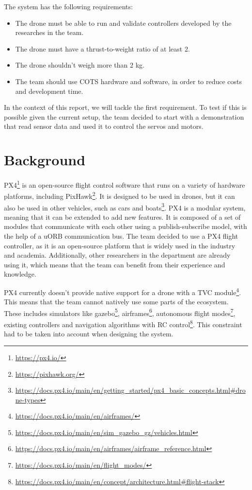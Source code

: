 \documentclass[a4paper]{article}
\begin{document}
The system has the following requirements: 
\begin{itemize}
    \item The drone must be able to run and validate controllers developed by the researches in the team. 
    \item The drone must have a thrust-to-weight ratio of at least 2. 
    \item The drone shouldn't weigh more than 2 kg. 
    \item The team should use COTS hardware and software, in order to reduce costs and development time. 
\end{itemize}

In the context of this report, we will tackle the first requirement. 
To test if this is possible given the current setup, the team decided to start with a demonstration that read sensor data and used it to control the servos and motors. 

\clearpage
\label{sec::background}
\section{Background}

PX4\footnote{\url{https://px4.io/}} is an open-source flight control software that runs on a variety of hardware platforms, including PixHawk\footnote{\url{https://pixhawk.org/}}.
It is designed to be used in drones, but it can also be used in other vehicles, such as cars and boats\footnote{\url{https://docs.px4.io/main/en/getting_started/px4_basic_concepts.html\#drone-types}}.
PX4 is a modular system, meaning that it can be extended to add new features.
It is composed of a set of modules that communicate with each other using a publish-subscribe model, with the help of a uORB communication bus. 
The team decided to use a PX4 flight controller, as it is an open-source platform that is widely used in the industry and academia. 
Additionally, other researchers in the department are already using it, which means that the team can benefit from their experience and knowledge. 

PX4 currently doesn't provide native support for a drone with a TVC module\footnote{\url{https://docs.px4.io/main/en/airframes/}}. This means that the team cannot natively use some parts of the ecosystem. 
These includes simulators like gazebo\footnote{\url{https://docs.px4.io/main/en/sim_gazebo_gz/vehicles.html}}, airframes\footnote{\url{https://docs.px4.io/main/en/airframes/airframe_reference.html}}, autonomous flight modes\footnote{\url{https://docs.px4.io/main/en/flight_modes/}}, existing controllers and navigation algorithms with RC control\footnote{\url{https://docs.px4.io/main/en/concept/architecture.html\#flight-stack}}. 
This constraint had to be taken into account when designing the system. 
\end{document}
